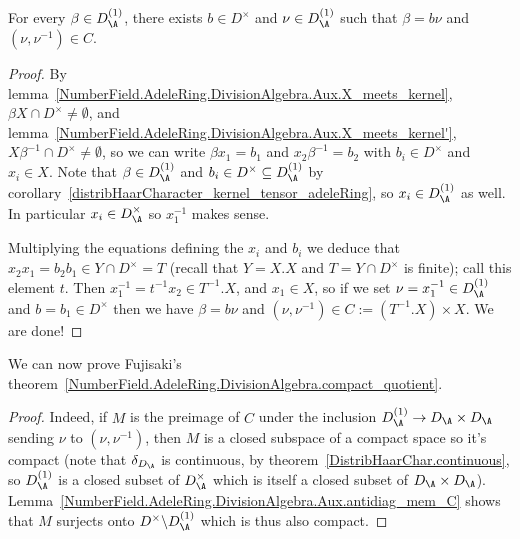 \begin{lemma}
  \label{NumberField.AdeleRing.DivisionAlgebra.Aux.antidiag_mem_C}
  \leanok
  For every $\beta\in D_{\A}^{(1)}$, there exists $b\in D^\times$
  and $\nu\in D_{\A}^{(1)}$ such that $\beta=b\nu$ and $(\nu,\nu^{-1})\in C.$
\end{lemma}
\begin{proof}
  By lemma~\ref{NumberField.AdeleRing.DivisionAlgebra.Aux.X_meets_kernel},
  $\beta X\cap D^\times\not=\emptyset$,
  and lemma~\ref{NumberField.AdeleRing.DivisionAlgebra.Aux.X_meets_kernel'},
  $X\beta^{-1}\cap D^\times\not=\emptyset$,
  so we can write $\beta x_1=b_1$ and $x_2\beta^{-1}=b_2$ with $b_i\in D^\times$ and $x_i\in X$.
  Note that $\beta\in D_{\A}^{(1)}$ and $b_i\in D^{\times}\subseteq D_{\A}^{(1)}$ by
  corollary~\ref{distribHaarCharacter_kernel_tensor_adeleRing}, so $x_i\in D_{\A}^{(1)}$
  as well. In particular $x_i\in D_{\A}^\times$ so $x_1^{-1}$ makes sense.

  Multiplying the equations defining the $x_i$ and $b_i$ we deduce that
  $x_2x_1=b_2b_1\in Y\cap D^\times=T$ (recall that $Y=X.X$ and $T=Y\cap D^\times$
  is finite); call this element $t$. Then $x_1^{-1}=t^{-1}x_2\in T^{-1}.X$,
  and $x_1\in X$, so if we set $\nu=x_1^{-1}\in D_{\A}^{(1)}$
  and $b=b_1\in D^\times$ then we have $\beta=b\nu$ and $(\nu,\nu^{-1})\in C := (T^{-1}.X)\times X$.
  We are done!
\end{proof}

We can now prove Fujisaki's theorem~\ref{NumberField.AdeleRing.DivisionAlgebra.compact_quotient}.

\begin{proof}
  Indeed, if $M$ is the preimage of $C$ under the inclusion $D_{\A}^{(1)} \to D_{\A}\times D_{\A}$
  sending $\nu$ to $(\nu,\nu^{-1})$, then $M$ is a closed subspace
    of a compact
  space so it's compact (note that $\delta_{D_{\A}}$ is continuous,
  by theorem~\ref{DistribHaarChar.continuous}, so $D_{\A}^{(1)}$ is a closed subset of
  $D_{\A}^\times$ which is itself a closed subset of $D_{\A}\times D_{\A}$).
  Lemma~\ref{NumberField.AdeleRing.DivisionAlgebra.Aux.antidiag_mem_C} shows that $M$ surjects onto
  $D^\times\backslash D_{\A}^{(1)}$ which is thus also compact.
\end{proof}

